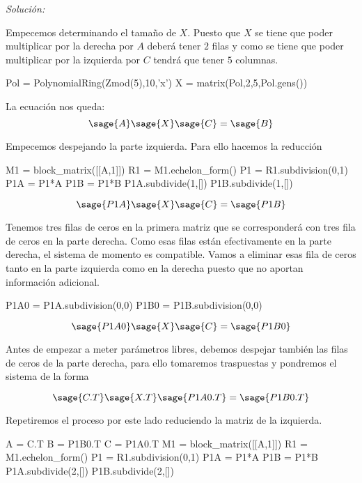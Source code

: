 \documentclass{amsart}
\begin{document}
{\it Solución:} 


Empecemos determinando el tamaño de $X$. Puesto que $X$ se tiene que poder
multiplicar por la derecha por $A$ deberá tener $2$ filas y como se tiene que
poder multiplicar por la izquierda por $C$ tendrá que tener $5$ columnas.

\begin{sageblock}
Pol = PolynomialRing(Zmod(5),10,'x')
X = matrix(Pol,2,5,Pol.gens())
\end{sageblock}

La ecuación nos queda:
$$ \sage{A} \sage{X} \sage{C} = \sage{B}$$

Empecemos despejando la parte izquierda. Para ello hacemos la reducción

\begin{sageblock}
M1 = block_matrix([[A,1]])
R1 = M1.echelon_form()
P1 = R1.subdivision(0,1)
P1A = P1*A
P1B = P1*B
P1A.subdivide(1,[])
P1B.subdivide(1,[])
\end{sageblock}

$$\sage{P1A} \sage{X} \sage{C} = \sage{P1B} $$

Tenemos tres filas de ceros en la primera matriz que se corresponderá con tres 
fila de ceros en la parte derecha. Como esas filas están efectivamente en la parte
derecha, el sistema de momento es compatible. 
Vamos a eliminar esas fila de ceros tanto en la parte
izquierda como en la derecha puesto que no aportan información adicional.

\begin{sageblock}
P1A0 = P1A.subdivision(0,0)
P1B0 = P1B.subdivision(0,0)
\end{sageblock}

$$\sage{P1A0} \sage{X} \sage{C} = \sage{P1B0} $$

Antes de empezar a meter parámetros libres, debemos despejar también las filas
de ceros de la parte derecha, para ello tomaremos traspuestas y pondremos
el sistema de la forma 

$$\sage{C.T} \sage{X.T} \sage{P1A0.T} = \sage{P1B0.T} $$

Repetiremos el proceso por este lado reduciendo la matriz de la izquierda.

\begin{sageblock}
A = C.T
B = P1B0.T
C = P1A0.T
M1 = block_matrix([[A,1]])
R1 = M1.echelon_form()
P1 = R1.subdivision(0,1)
P1A = P1*A
P1B = P1*B
P1A.subdivide(2,[])
P1B.subdivide(2,[])
\end{sageblock}
\end{document}
